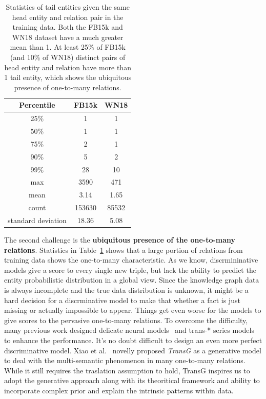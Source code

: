 \documentclass[twocolumn,a4paper,10pt,review,3p]{elsarticle}
\begin{document}
\begin{table}
    \centering
    \begin{tabular}{ccc}
        \toprule
        Percentile & FB15k & WN18 \\
        \midrule
        25\% &  1   & 1  \\
        50\% &  1   & 1 \\
        75\% &  2   & 1 \\
        90\% &  5   & 2 \\
        99\% &  28  & 10 \\
        max & 3590  &  471 \\
        \midrule
        mean &  3.14 & 1.65 \\
        count & 153630 & 85532 \\
        standard deviation & 18.36 & 5.08 \\
        \bottomrule
    \end{tabular}
    \caption{Statistics of tail entities given the same head entity and relation pair in the training data. Both the FB15k and WN18 dataset have a much greater mean than 1. At least 25\% of FB15k (and 10\% of WN18) distinct pairs of head entity and relation have more than 1 tail entity, which shows the ubiquitous presence of one-to-many relations. }
\label{one-to-many}
\end{table}


The second challenge is the \textbf{ubiquitous presence of the one-to-many relations}.
Statistics in Table~\ref{one-to-many} shows that a large portion of relations from training data shows the one-to-many characteristic.
As we know, discrmininative models give a score to every single new triple, but lack the ability to predict the entity probabilistic distribution in a global view.
Since the knowledge graph data is always incomplete and the true data distribution is unknown, it might be a hard decision for a discrminative model to make that whether a fact is just missing or actually impossible to appear.
Things get even worse for the models to give scores to the pervasive one-to-many relations.
To overcome the difficulty, many previous work designed delicate neural models~\cite{NTN} and trans-* series models~\cite{TransH2014,TransR2015,TransD} to enhance the performance. It's no doubt difficult to design an even more perfect discriminative model. Xiao et al.~\cite{TransG} novelly proposed \emph{TransG} as a generative model to deal with the multi-semantic phenomenon in many one-to-many relations. While it still requires the traslation assumption to hold, TransG inspires us to adopt the generative approach along with its theoritical framework and ability to incorporate complex prior and explain the intrinsic patterns within data.
\end{document}
